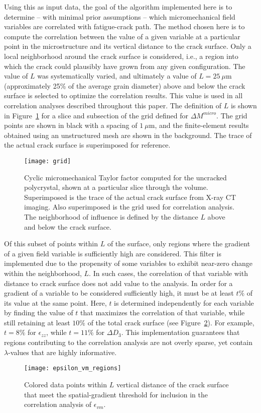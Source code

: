 Using this as input data, the goal of the algorithm implemented here is to determine -- with minimal prior assumptions -- which micromechanical field variables are correlated with fatigue-crack path. The method chosen here is to compute the correlation between the value of a given variable at a particular point in the microstructure and its vertical distance to the crack surface. Only a local neighborhood around the crack surface is considered, i.e., a region into which the crack could plausibly have grown from any given configuration. The value of $L$ was systematically varied, and ultimately a value of $L=25~\mu$m (approximately 25\% of the average grain diameter) above and below the crack surface is selected to optimize the correlation results. This value is used in all correlation analyses described throughout this paper. The definition of $L$ is shown in Figure~\ref{fig:grid} for a slice and subsection of the grid defined for $\Delta M^{micro}$. The grid points are shown in black with a spacing of $1~\mu$m, and the finite-element results obtained using an unstructured mesh are shown in the background. The trace of the actual crack surface is superimposed for reference.  
\begin{figure}[b]
  \centering
    \texttt{[image: grid]}
    \caption{Cyclic micromechanical Taylor factor computed for the uncracked polycrystal, shown at a particular slice through the volume. Superimposed is the trace of the actual crack surface from X-ray CT imaging. Also superimposed is the grid used for correlation analysis. The neighborhood of influence is defined by the distance $L$ above and below the crack surface.}
    \label{fig:grid}
\end{figure}

Of this subset of points within $L$ of the surface, only regions where the gradient of a given field variable is sufficiently high are considered. This filter is implemented due to the propensity of some variables to exhibit near-zero change within the neighborhood, $L$. In such cases, the correlation of that variable with distance to crack surface does not add value to the analysis. In order for a gradient of a variable to be considered sufficiently high, it must be at least $t\%$ of its value at the same point. Here, $t$ is determined independently for each variable by finding the value of $t$ that maximizes the correlation of that variable, while still retaining at least $10\%$ of the total crack surface (see Figure~\ref{fig:epsilon_vm_regions}). For example, $t=8\%$ for $\epsilon_{zz}$, while $t=11\%$ for $\Delta D_3$. This implementation guarantees that regions contributing to the correlation analysis are not overly sparse, yet contain $\lambda$-values that are highly informative. 
\begin{figure}[t]
  \centering
    \texttt{[image: epsilon\_vm\_regions]}
    \caption{Colored data points within $L$ vertical distance of the crack surface that meet the spatial-gradient threshold for inclusion in the correlation analysis of $\epsilon_{vm}$.}
    \label{fig:epsilon_vm_regions}
\end{figure}

